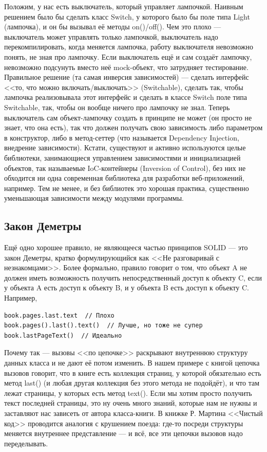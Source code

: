 \documentclass{../text-style}
\begin{document}
\begin{itemize}
        Положим, у нас есть выключатель, который управляет лампочкой. Наивным решением было бы сделать класс Switch, у которого было бы поле типа Light (лампочка), и он бы вызывал её методы on()/off(). Чем это плохо --- выключатель может управлять только лампочкой, выключатель надо перекомпилировать, когда меняется лампочка, работу выключателя невозможно понять, не зная про лампочку. Если выключатель ещё и сам создаёт лампочку, невозможно подсунуть вместо неё mock-объект, что затрудняет тестирование. Правильное решение (та самая инверсия зависимостей) --- сделать интерфейс <<то, что можно включать/выключать>> (Switchable), сделать так, чтобы лампочка реализовывала этот интерфейс и сделать в классе Switch поле типа Switchable, так, чтобы он вообще ничего про лампочку не знал. Теперь выключатель сам объект-лампочку создать в принципе не может (он просто не знает, что она есть), так что должен получать свою зависимость либо параметром в конструктор, либо в метод-сеттер (что называется Dependency Injection, внедрение зависимости). Кстати, существуют и активно используются целые библиотеки, занимающиеся управлением зависимостями и инициализацией объектов, так называемые IoC-контейнеры (Inversion of Control), без них не обходится ни одна современная библиотека для разработки веб-приложений, например. Тем не менее, и без библиотек это хорошая практика, существенно уменьшающая зависимости между модулями программы.
\end{itemize}

\subsection{Закон Деметры}

Ещё одно хорошее правило, не являющееся частью принципов SOLID --- это закон Деметры, кратко формулирующийся как <<Не разговаривай с незнакомцами>>. Более формально, правило говорит о том, что объект A не должен иметь возможность получить непосредственный доступ к объекту C, если у объекта A есть доступ к объекту B, и у объекта B есть доступ к объекту C. Например,

\begin{verbatim}
book.pages.last.text  // Плохо
book.pages().last().text()  // Лучше, но тоже не супер
book.lastPageText()  // Идеально
\end{verbatim}

Почему так --- вызовы <<по цепочке>> раскрывают внутреннюю структуру данных класса и не дают её потом изменить. В нашем примере с книгой цепочка вызовов говорит, что в книге есть коллекция страниц, у которой обязательно есть метод last() (и любая другая коллекция без этого метода не подойдёт), и что там лежат страницы, у которых есть метод text(). Если мы хотим просто получить текст последней страницы, это ну очень много знаний, которые нам не нужны и заставляют нас зависеть от автора класса-книги. В книжке Р. Мартина <<Чистый код>> проводится аналогия с крушением поезда: где-то посреди структуры меняется внутреннее представление --- и всё, все эти цепочки вызовов надо переделывать.
\end{document}

